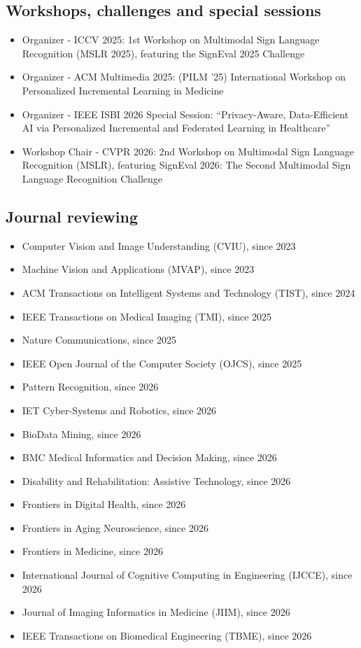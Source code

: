 \documentclass[10pt,a4paper]{article}
\begin{document}
\subsection{Workshops, challenges and special sessions}
\begin{itemize}
\item Organizer - ICCV 2025: 1st Workshop on Multimodal Sign Language Recognition (MSLR 2025), featuring the SignEval 2025 Challenge
\item Organizer - ACM Multimedia 2025: (PILM ’25) International Workshop on Personalized Incremental Learning in Medicine
\item Organizer - IEEE ISBI 2026 Special Session: “Privacy-Aware, Data-Efficient AI via Personalized Incremental and Federated Learning in Healthcare”
\item Workshop Chair - CVPR 2026: 2nd Workshop on Multimodal Sign Language Recognition (MSLR), featuring SignEval 2026: The Second Multimodal Sign Language Recognition Challenge
\end{itemize}
\subsection{Journal reviewing}
\begin{itemize}
\item Computer Vision and Image Understanding (CVIU), since 2023
\item Machine Vision and Applications (MVAP), since 2023
\item ACM Transactions on Intelligent Systems and Technology (TIST), since 2024
\item IEEE Transactions on Medical Imaging (TMI), since 2025
\item Nature Communications, since 2025
\item IEEE Open Journal of the Computer Society (OJCS), since 2025
\item Pattern Recognition, since 2026
\item IET Cyber-Systems and Robotics, since 2026
\item BioData Mining, since 2026
\item BMC Medical Informatics and Decision Making, since 2026
\item Disability and Rehabilitation: Assistive Technology, since 2026
\item Frontiers in Digital Health, since 2026
\item Frontiers in Aging Neuroscience, since 2026
\item Frontiers in Medicine, since 2026
\item International Journal of Cognitive Computing in Engineering (IJCCE), since 2026
\item Journal of Imaging Informatics in Medicine (JIIM), since 2026
\item IEEE Transactions on Biomedical Engineering (TBME), since 2026
\end{itemize}
\end{document}
